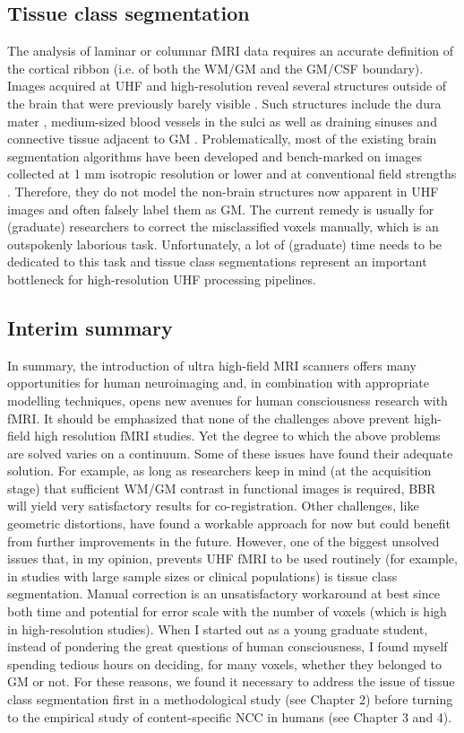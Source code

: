 \subsection{Tissue class segmentation}
The analysis of laminar or columnar fMRI data requires an accurate definition of the cortical ribbon (i.e. of both the WM/GM and the GM/CSF boundary). Images acquired at UHF and high-resolution reveal several structures outside of the brain that were previously barely visible \parencite{Viviani2017}. Such structures include the dura mater \parencite{VanderKouwe2008}, medium-sized blood vessels in the sulci \parencite{Viviani2016} as well as draining sinuses and connective tissue adjacent to GM \parencite{Helms2006}. Problematically, most of the existing brain segmentation algorithms have been developed and bench-marked on images collected at 1 mm isotropic resolution or lower and at conventional field strengths \parencite{Helms2016}. Therefore, they do not model the non-brain structures now apparent in UHF images and often falsely label them as GM. The current remedy is usually for (graduate) researchers to correct the misclassified voxels manually, which is an outspokenly laborious task. Unfortunately, a lot of (graduate) time needs to be dedicated to this task and tissue class segmentations represent an important bottleneck for high-resolution UHF processing pipelines.

\subsection{Interim summary}
In summary, the introduction of ultra high-field MRI scanners offers many opportunities for human neuroimaging and, in combination with appropriate modelling techniques, opens new avenues for human consciousness research with fMRI. It should be emphasized that none of the challenges above prevent high-field high resolution fMRI studies. Yet the degree to which the above problems are solved varies on a continuum. Some of these issues have found their adequate solution. For example, as long as researchers keep in mind (at the acquisition stage) that sufficient WM/GM contrast in functional images is required, BBR will yield very satisfactory results for co-registration. Other challenges, like geometric distortions, have found a workable approach for now but could benefit from further improvements in the future. However, one of the biggest unsolved issues that, in my opinion, prevents UHF fMRI to be used routinely (for example, in studies with large sample sizes or clinical populations) is tissue class segmentation. Manual correction is an unsatisfactory workaround at best since both time and potential for error scale with the number of voxels (which is high in high-resolution studies). When I started out as a young graduate student, instead of pondering the great questions of human consciousness, I found myself spending tedious hours on deciding, for many voxels, whether they belonged to GM or not. For these reasons, we found it necessary to address the issue of tissue class segmentation first in a methodological study (see Chapter 2) before turning to the empirical study of content-specific NCC in humans (see Chapter 3 and 4).

